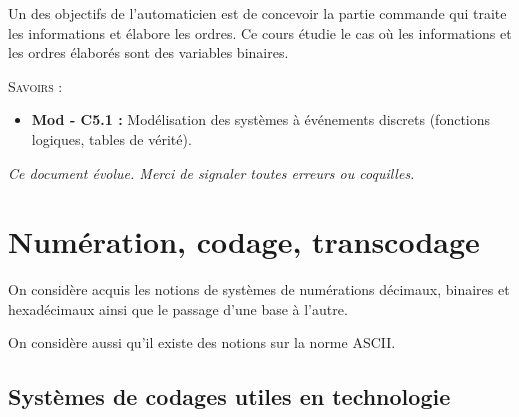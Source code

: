 \documentclass[10pt]{article}
\begin{document}




Un des objectifs de l'automaticien est de concevoir la partie commande qui traite les informations et élabore les ordres. Ce cours étudie le cas où les informations et les ordres élaborés sont des variables binaires.

\begin{savoir}
\textsc{Savoirs :}
\begin{itemize}
\item \textbf{Mod - C5.1 :} Modélisation des systèmes à événements discrets (fonctions logiques, tables de vérité).
\end{itemize}
\end{savoir}


\setlength{\parskip}{0ex plus 0.2ex minus 0ex}
 \renewcommand{\contentsname}{}
 \renewcommand{\baselinestretch}{1}

\tableofcontents

 \renewcommand{\baselinestretch}{1.2}
\setlength{\parskip}{2ex plus 0.5ex minus 0.2ex}

\textit{Ce document évolue. Merci de signaler toutes erreurs ou coquilles.}




\section{Numération, codage, transcodage}
\begin{rem}
On considère acquis les notions de systèmes de numérations décimaux, binaires et hexadécimaux ainsi que le passage d'une base à l'autre.

On considère aussi qu'il existe des notions sur la norme ASCII. 
\end{rem}

\subsection{Systèmes de codages utiles en technologie} 
\end{document}
